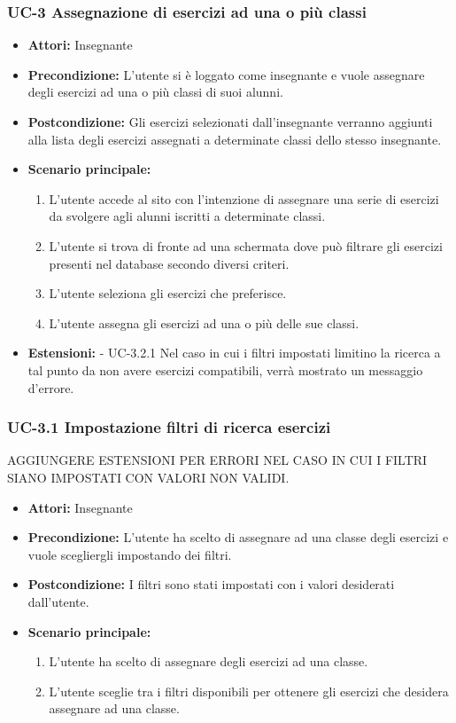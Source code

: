 \newpage
\subsubsection{UC-3 Assegnazione di esercizi ad una o più classi}
	\begin{itemize}
		\item \textbf{Attori: } Insegnante
		\item \textbf{Precondizione: } L'utente si è loggato come insegnante e vuole assegnare degli esercizi ad una o più classi di suoi alunni. 
		\item \textbf{Postcondizione: } Gli esercizi selezionati dall'insegnante verranno aggiunti alla lista degli esercizi assegnati a determinate classi dello stesso insegnante.
		\item \textbf{Scenario principale: } 
		\begin{enumerate}
			\item L'utente accede al sito con l'intenzione di assegnare una serie di esercizi da svolgere agli alunni iscritti a determinate classi. 
			\item L'utente si trova di fronte ad una schermata dove può filtrare gli esercizi presenti nel database secondo diversi criteri.
			\item L'utente seleziona gli esercizi che preferisce.
			\item L'utente assegna gli esercizi ad una o più delle sue classi. 
		\end{enumerate} 
		\item \textbf{Estensioni: }
		- UC-3.2.1 Nel caso in cui i filtri impostati limitino la ricerca a tal punto da non avere esercizi compatibili, verrà mostrato un messaggio d'errore. 
	\end{itemize}
\subsubsection{UC-3.1 Impostazione filtri di ricerca esercizi}

AGGIUNGERE ESTENSIONI PER ERRORI NEL CASO IN CUI I FILTRI SIANO IMPOSTATI CON VALORI NON VALIDI.
\begin{itemize}
		\item \textbf{Attori: } Insegnante
		\item \textbf{Precondizione: }L'utente ha scelto di assegnare ad una classe degli esercizi e vuole scegliergli impostando dei filtri.	
		\item \textbf{Postcondizione: }I filtri sono stati impostati con i valori desiderati dall'utente.
		\item \textbf{Scenario principale: }
		\begin{enumerate}
			\item L'utente ha scelto di assegnare degli esercizi ad una classe. 				\item L'utente sceglie tra i filtri disponibili per ottenere gli esercizi che desidera assegnare ad una classe.
		\end{enumerate}
\end{itemize}
